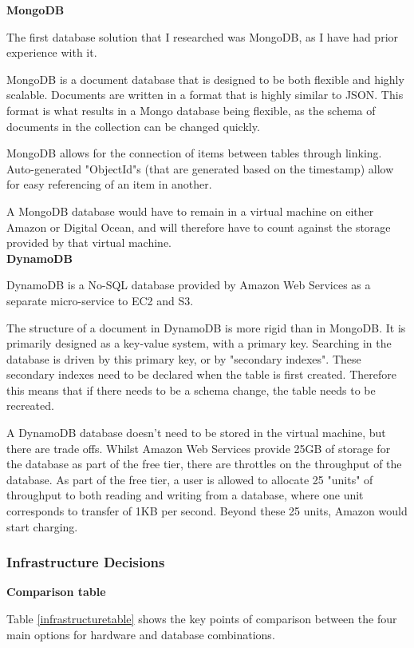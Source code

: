 \documentclass[12pt]{article}
\begin{document}
\textbf{MongoDB}

The first database solution that I researched was MongoDB, as I have had prior experience with it. 

MongoDB is a document database that is designed to be both flexible and highly scalable. Documents are written in a format that is highly similar to JSON. This format is what results in a Mongo database being flexible, as the schema of documents in the collection can be changed quickly. 

MongoDB allows for the connection of items between tables through linking. Auto-generated "ObjectId"s (that are generated based on the timestamp) allow for easy referencing of an item in another.

A MongoDB database would have to remain in a virtual machine on either Amazon or Digital Ocean, and will therefore have to count against the storage provided by that virtual machine. \\

\textbf{DynamoDB}

DynamoDB is a No-SQL database provided by Amazon Web Services as a separate micro-service to EC2 and S3. 

The structure of a document in DynamoDB is more rigid than in MongoDB. It is primarily designed as a key-value system, with a primary key. Searching in the database is driven by this primary key, or by "secondary indexes". These secondary indexes need to be declared when the table is first created. Therefore this means that if there needs to be a schema change, the table needs to be recreated.

A DynamoDB database doesn't need to be stored in the virtual machine, but there are trade offs. Whilst Amazon Web Services provide 25GB of storage for the database as part of the free tier, there are throttles on the throughput of the database. As part of the free tier, a user is allowed to allocate 25 "units" of throughput to both reading and writing from a database, where one unit corresponds to transfer of 1KB per second. Beyond these 25 units, Amazon would start charging.

\subsubsection{Infrastructure Decisions}

\textbf{Comparison table}

Table \ref{infrastructuretable} shows the key points of comparison between the four main options for hardware and database combinations. \\
\end{document}
